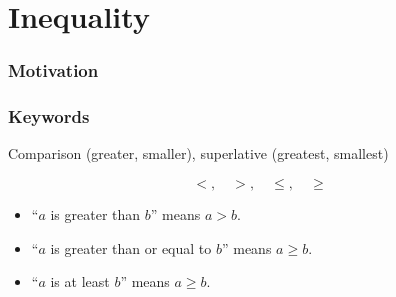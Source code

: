 \section{Inequality}
\frame{\sectionpage}


\begin{frame}
\frametitle{Motivation}
\end{frame}


\begin{frame}
\frametitle{Keywords}
Comparison (greater, smaller), superlative (greatest, smallest) \pause
\bigskip

\[ <, \quad >, \quad \leq, \quad \geq\]

\begin{remark}{}
\begin{itemize}
\item ``$a$ is greater than $b$'' means $a > b$.
\item ``$a$ is greater than or equal to $b$'' means $a \geq b$.
\item ``$a$ is at least $b$'' means $a \geq b$.
\end{itemize}
\end{remark}
\end{frame}

